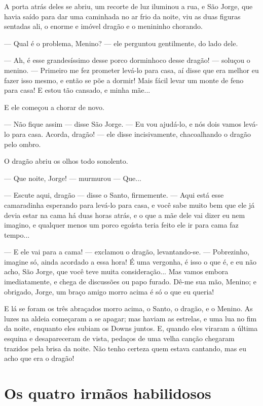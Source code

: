 A porta atrás deles se abriu, um recorte de luz iluminou a rua, e São
Jorge, que havia saído para dar uma caminhada no ar frio da noite,
viu as duas figuras sentadas ali, o enorme e imóvel dragão e o
menininho chorando.

— Qual é o problema, Menino? — ele perguntou gentilmente, do lado
dele.

— Ah, é esse grandesíssimo desse porco dorminhoco desse dragão! —
soluçou o menino. — Primeiro me fez prometer levá-lo para casa, aí
disse que era melhor eu fazer isso mesmo, e então se põe a dormir!
Mais fácil levar um monte de feno para casa! E estou tão cansado, e
minha mãe...

E ele começou a chorar de novo.

— Não fique assim — disse São Jorge. — Eu vou ajudá-lo, e nós dois
vamos levá-lo para casa. Acorda, dragão! — ele disse incisivamente,
chacoalhando o dragão pelo ombro.

O dragão abriu os olhos todo sonolento.

— Que noite, Jorge! — murmurou — Que...

— Escute aqui, dragão — disse o Santo, firmemente. — Aqui está esse
camaradinha esperando para levá-lo para casa, e você sabe muito bem
que ele já devia estar na cama há duas horas atrás, e o que a mãe
dele vai dizer eu nem imagino, e qualquer menos um porco egoísta
teria feito ele ir para cama faz tempo...

— E ele vai para a cama! — exclamou o dragão, levantando-se. —
Pobrezinho, imagine só, ainda acordado a essa hora! É uma vergonha, é
isso o que é, e eu não acho, São Jorge, que você teve muita
consideração... Mas vamos embora imediatamente, e chega de discussões
ou papo furado. Dê-me sua mão, Menino; e obrigado, Jorge, um braço
amigo morro acima é só o que eu queria!

E lá se foram os três abraçados morro acima, o Santo, o dragão, e o
Menino. As luzes na aldeia começaram a se apagar; mas haviam as
estrelas, e uma lua no fim da noite, enquanto eles subiam os Downs
juntos. E, quando eles viraram a última esquina e desapareceram de
vista, pedaços de uma velha canção chegaram trazidos pela brisa da
noite. Não tenho certeza quem estava cantando, mas eu acho que era o
dragão!

\chapter{Os quatro irmãos habilidosos}

